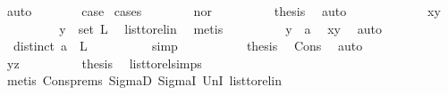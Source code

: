 \begin{isabellebody}
\ auto\isanewline
\ \ \ \ \isamarkupfalse%
\ \isamarkupfalse%
\ {\isacharquery}{\kern0pt}case\ \isamarkupfalse%
{\isacharparenleft}{\kern0pt}cases{\isacharparenright}{\kern0pt}\isanewline
\ \ \ \ \ \ \isamarkupfalse%
\ nor\isanewline
\ \ \ \ \ \ \isamarkupfalse%
\ \isamarkupfalse%
\ {\isacharquery}{\kern0pt}thesis\ \isamarkupfalse%
\ auto\isanewline
\ \ \ \ \isamarkupfalse%
\isanewline
\ \ \ \ \ \ \isamarkupfalse%
\ xy\ \isanewline
\ \ \ \ \ \ \isamarkupfalse%
\ \isamarkupfalse%
\ {\isachardoublequoteopen}y\ {\isasymin}\ set\ L{\isachardoublequoteclose}\ \isamarkupfalse%
\ list{\isacharunderscore}{\kern0pt}to{\isacharunderscore}{\kern0pt}rel{\isacharunderscore}{\kern0pt}in\ \isamarkupfalse%
\ metis\isanewline
\ \ \ \ \ \ \isamarkupfalse%
\ \isamarkupfalse%
\ {\isachardoublequoteopen}y\ {\isacharequal}{\kern0pt}\ a{\isachardoublequoteclose}\ \isamarkupfalse%
\ xy\ \isamarkupfalse%
\ auto\isanewline
\ \ \ \ \ \ \isamarkupfalse%
\ \isamarkupfalse%
\ {\isachardoublequoteopen}{\isasymnot}\ distinct\ {\isacharparenleft}{\kern0pt}a\ {\isacharhash}{\kern0pt}\ L{\isacharparenright}{\kern0pt}{\isachardoublequoteclose}\isanewline
\ \ \ \ \ \ \ \ \isamarkupfalse%
\ simp\ \isanewline
\ \ \ \ \ \ \isamarkupfalse%
\ \isamarkupfalse%
\ {\isacharquery}{\kern0pt}thesis\ \isamarkupfalse%
\ Cons\ \isamarkupfalse%
\ auto\isanewline
\ \ \ \ \isamarkupfalse%
\isanewline
\ \ \ \ \ \ \isamarkupfalse%
\ yz\isanewline
\ \ \ \ \ \ \isamarkupfalse%
\ \isamarkupfalse%
\ {\isacharquery}{\kern0pt}thesis\ \isamarkupfalse%
\ list{\isacharunderscore}{\kern0pt}to{\isacharunderscore}{\kern0pt}rel{\isachardot}{\kern0pt}simps{\isacharparenleft}{\kern0pt}{}{\isacharparenright}{\kern0pt}\isanewline
\ \ \ \ \ \ \ \ \isamarkupfalse%
\ {\isacharparenleft}{\kern0pt}metis\ Cons{\isachardot}{\kern0pt}prems{\isacharparenleft}{\kern0pt}{}{\isacharparenright}{\kern0pt}\ SigmaD{}\ SigmaI\ UnI{}\ list{\isacharunderscore}{\kern0pt}to{\isacharunderscore}{\kern0pt}rel{\isacharunderscore}{\kern0pt}in{\isacharparenright}{\kern0pt}\ \ \isanewline
\ \ \ \ \isamarkupfalse%

\end{isabellebody}
